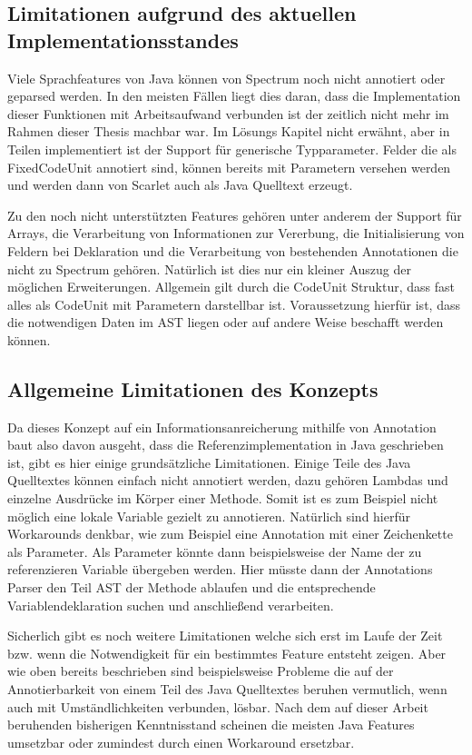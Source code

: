 \documentclass[12pt,oneside,a4paper,parskip]{scrbook}
\begin{document}
\subsection{Limitationen aufgrund des aktuellen Implementationsstandes}

Viele Sprachfeatures von Java können von Spectrum noch nicht annotiert oder geparsed werden. In den meisten Fällen liegt dies daran, dass die Implementation dieser Funktionen mit Arbeitsaufwand verbunden ist der zeitlich nicht mehr im Rahmen dieser Thesis machbar war. Im Lösungs Kapitel nicht erwähnt, aber in Teilen implementiert ist der Support für generische Typparameter. Felder die als FixedCodeUnit annotiert sind, können bereits mit Parametern versehen werden und werden dann von Scarlet auch als Java Quelltext erzeugt.

Zu den noch nicht unterstützten Features gehören unter anderem der Support für Arrays, die Verarbeitung von Informationen zur Vererbung, die Initialisierung von Feldern bei Deklaration und die Verarbeitung von bestehenden Annotationen die nicht zu Spectrum gehören. Natürlich ist dies nur ein kleiner Auszug der möglichen Erweiterungen. Allgemein gilt durch die CodeUnit Struktur, dass fast alles als CodeUnit mit Parametern darstellbar ist. Voraussetzung hierfür ist, dass die notwendigen Daten im AST liegen oder auf andere Weise beschafft werden können.

\subsection{Allgemeine Limitationen des Konzepts}

Da dieses Konzept auf ein Informationsanreicherung mithilfe von Annotation baut also davon ausgeht, dass die Referenzimplementation in Java geschrieben ist, gibt es hier einige grundsätzliche Limitationen. Einige Teile des Java Quelltextes können einfach nicht annotiert werden, dazu gehören Lambdas und einzelne Ausdrücke im Körper einer Methode. Somit ist es zum Beispiel nicht möglich eine lokale Variable gezielt zu annotieren. Natürlich sind hierfür Workarounds denkbar, wie zum Beispiel eine Annotation mit einer Zeichenkette als Parameter. Als Parameter könnte dann beispielsweise der Name der zu referenzieren Variable übergeben werden. Hier müsste dann der Annotations Parser den Teil AST der Methode ablaufen und die entsprechende Variablendeklaration suchen und anschließend verarbeiten.

Sicherlich gibt es noch weitere Limitationen welche sich erst im Laufe der Zeit bzw. wenn die Notwendigkeit für ein bestimmtes Feature entsteht zeigen. Aber wie oben bereits beschrieben sind beispielsweise Probleme die auf der Annotierbarkeit von einem Teil des Java Quelltextes beruhen vermutlich, wenn auch mit Umständlichkeiten verbunden, lösbar. Nach dem auf dieser Arbeit beruhenden bisherigen Kenntnisstand scheinen die meisten Java Features umsetzbar oder zumindest durch einen Workaround ersetzbar.
\end{document}
